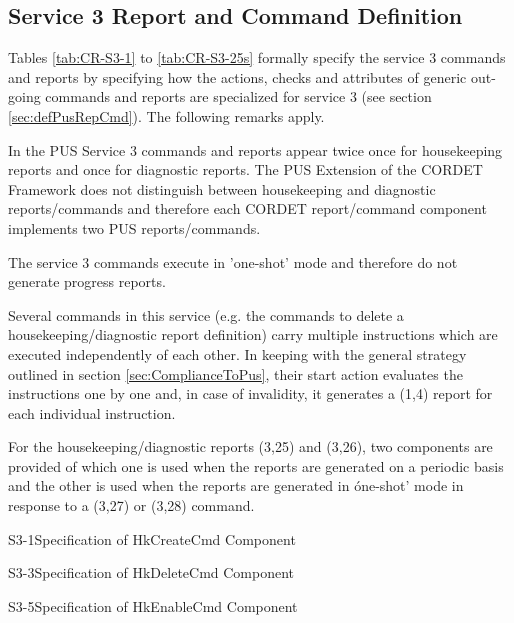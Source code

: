 \documentclass[a4paper,10pt]{article}
\newenvironment{fw_itemize}						%
{\begin{itemize}
  \setlength{\itemsep}{1mm}
  \setlength{\parskip}{0pt}
  \setlength{\parsep}{0pt}}
{\end{itemize}}
\newenvironment{cr_cmd}[2]
{
\begin{longtable}{|p{3cm}|p{9.6cm}|}
\caption{#2} \label{tab:CR-#1} \\
\hline
\rowcolor{light-gray}
\DTLforeach*{dbCmd}{\att=Attribute,\attValue=#1}
{\DTLiffirstrow{}{\\\hline}\att & \attValue}\\\hline
}
{\end{longtable}}
\begin{document}
\subsection{Service 3 Report and Command Definition}\label{sec:serv3RepCmdDef}
Tables \ref{tab:CR-S3-1} to \ref{tab:CR-S3-25s} formally specify the service 3 commands and reports by specifying how the actions, checks and attributes of generic out-going commands and reports are specialized for service 3 (see section \ref{sec:defPusRepCmd}). The following remarks apply.

\begin{fw_itemize}
\item In the PUS Service 3 commands and reports appear twice once for housekeeping reports and once for diagnostic reports. The PUS Extension of the CORDET Framework does not distinguish between housekeeping and diagnostic reports/commands and therefore each CORDET report/command component implements two PUS reports/commands.
\item The service 3 commands execute in 'one-shot' mode and therefore do not generate progress reports.
\item Several commands in this service (e.g. the commands to delete a housekeeping/diagnostic report definition) carry multiple instructions which are executed independently of each other. In keeping with the general strategy outlined in section \ref{sec:ComplianceToPus}, their start action evaluates the instructions one by one and, in case of invalidity, it generates a (1,4) report for each individual instruction.
\item For the housekeeping/diagnostic reports (3,25) and (3,26), two components are provided of which one is used when the reports are generated on a periodic basis and the other is used when the reports are generated in óne-shot' mode in response to a (3,27) or (3,28) command.
\end{fw_itemize}

\newpage
\begin{cr_cmd}{S3-1}{Specification of HkCreateCmd Component}
\end{cr_cmd}

\begin{cr_cmd}{S3-3}{Specification of HkDeleteCmd Component}
\end{cr_cmd}

\newpage
\begin{cr_cmd}{S3-5}{Specification of HkEnableCmd Component}
\end{cr_cmd}
\end{document}
